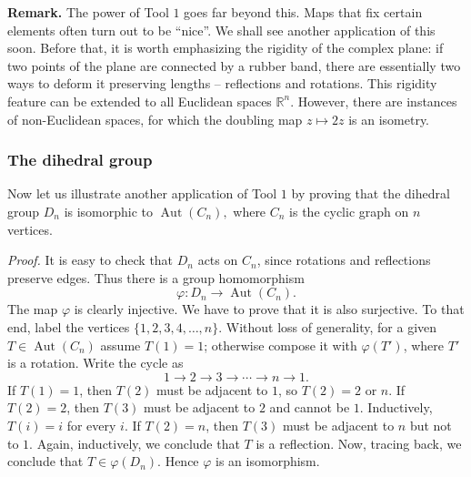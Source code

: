 \documentclass[11pt,a4paper]{article}
\begin{document}
\textbf{Remark.}
The power of Tool $1$ goes far beyond this. Maps that fix certain elements often turn out to be ``nice''. We shall see another application of this soon. Before that, it is worth emphasizing the rigidity of the complex plane: if two points of the plane are connected by a rubber band, there are essentially two ways to deform it preserving lengths -- reflections and rotations. This rigidity feature can be extended to all Euclidean spaces $\mathbb R^n$. However, there are instances of non-Euclidean spaces, for which the doubling map $z\mapsto 2z$ is an isometry. 

\subsubsection*{The dihedral group}
Now let us illustrate another application of Tool $1$ by proving that the dihedral group \(D_n\) is isomorphic to \(\operatorname{Aut}(C_n),\) where $C_n$ is the cyclic graph on $n$ vertices.

\textit{Proof.}
It is easy to check that $D_n$ acts on $C_n$, since rotations and reflections preserve edges. Thus there is a group homomorphism
\[
\varphi\colon D_n\longrightarrow\operatorname{Aut}(C_n).
\]
The map $\varphi$ is clearly injective. We have to prove that it is also surjective. To that end, label the vertices $\{1,2,3,4,\ldots,n\}$. Without loss of generality, for a given $T\in\operatorname{Aut}(C_n)$ assume $T(1)=1$; otherwise compose it with $\varphi(T')$, where $T'$ is a rotation. Write the cycle as
\[
1\longrightarrow2\longrightarrow3\longrightarrow\cdots
\longrightarrow n\longrightarrow1.
\]
If $T(1)=1$, then $T(2)$ must be adjacent to $1$, so $T(2)=2$ or $n$. If $T(2)=2$, then $T(3)$ must be adjacent to $2$ and cannot be $1$. Inductively, $T(i)=i$ for every $i$. If $T(2)=n$, then $T(3)$ must be adjacent to $n$ but not to $1$. Again, inductively, we conclude that $T$ is a reflection. Now, tracing back, we conclude that $T\in\varphi(D_n)$. Hence $\varphi$ is an isomorphism.
\end{document}
